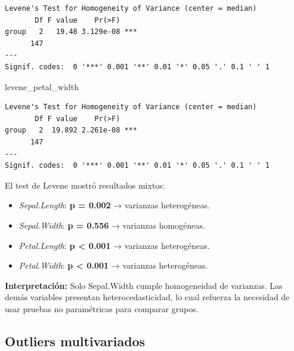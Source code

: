 \documentclass[
  spanish,
  11pt,
  a4paper,
  DIV=11,
  numbers=noendperiod]{scrartcl}
\newenvironment{Shaded}{\begin{snugshade}}{\end{snugshade}}
\newcommand{\NormalTok}[1]{\textcolor[rgb]{0.00,0.23,0.31}{#1}}
\begin{document}
\begin{verbatim}
Levene's Test for Homogeneity of Variance (center = median)
       Df F value    Pr(>F)    
group   2   19.48 3.129e-08 ***
      147                      
---
Signif. codes:  0 '***' 0.001 '**' 0.01 '*' 0.05 '.' 0.1 ' ' 1
\end{verbatim}

\begin{Shaded}
\begin{Highlighting}[numbers=left,,]
\NormalTok{levene\_petal\_width}
\end{Highlighting}
\end{Shaded}

\begin{verbatim}
Levene's Test for Homogeneity of Variance (center = median)
       Df F value    Pr(>F)    
group   2  19.892 2.261e-08 ***
      147                      
---
Signif. codes:  0 '***' 0.001 '**' 0.01 '*' 0.05 '.' 0.1 ' ' 1
\end{verbatim}

El test de Levene mostró resultados mixtos:

\begin{itemize}
\item
  \emph{Sepal.Length}: \textbf{p = 0.002} → varianzas heterogéneas.
\item
  \emph{Sepal.Width}: \textbf{p = 0.556} → varianzas homogéneas.
\item
  \emph{Petal.Length}: \textbf{p \textless{} 0.001} → varianzas
  heterogéneas.
\item
  \emph{Petal.Width}: \textbf{p \textless{} 0.001} → varianzas
  heterogéneas.
\end{itemize}

\textbf{Interpretación:} Solo Sepal.Width cumple homogeneidad de
varianzas. Las demás variables presentan heterocedasticidad, lo cual
refuerza la necesidad de usar pruebas no paramétricas para comparar
grupos.

\subsection{Outliers multivariados}\label{outliers-multivariados}
\end{document}
